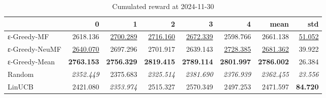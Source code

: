\begin{table}
\caption{Cumulated reward at 2024-11-30}
\begin{tabular}{lrrrrrrr}
\toprule
 & 0 & 1 & 2 & 3 & 4 & mean & std \\
\midrule
ε-Greedy-MF & 2618.136 & \underline{2700.289} & \underline{2716.160} & \underline{2672.339} & 2598.766 & 2661.138 & \underline{51.052} \\
ε-Greedy-NeuMF & \underline{2640.070} & 2697.296 & 2701.917 & 2639.143 & \underline{2728.385} & \underline{2681.362} & 39.922 \\
ε-Greedy-Mean & \textbf{2763.153} & \textbf{2756.329} & \textbf{2819.415} & \textbf{2789.114} & \textbf{2801.997} & \textbf{2786.002} & 26.384 \\
Random & \textit{2352.449} & 2375.683 & \textit{2325.514} & \textit{2381.690} & \textit{2376.939} & \textit{2362.455} & \textit{23.556} \\
LinUCB & 2421.080 & \textit{2353.974} & 2515.327 & 2570.349 & 2497.253 & 2471.597 & \textbf{84.720} \\
\bottomrule
\end{tabular}
\end{table}
